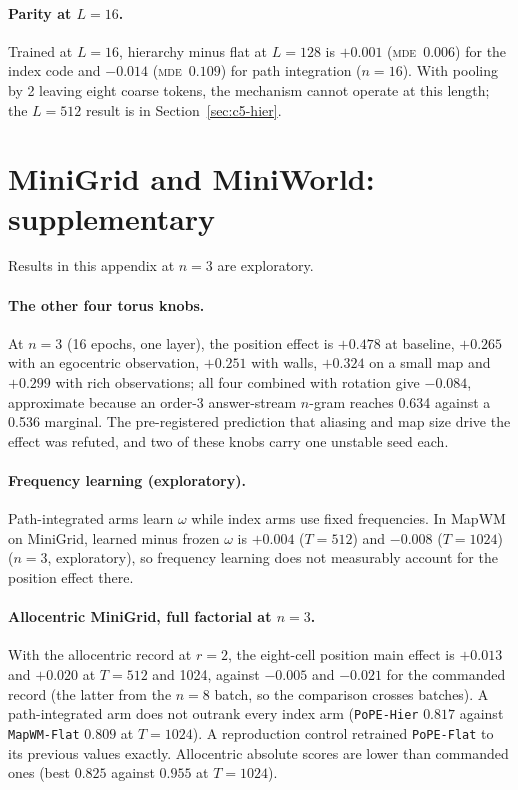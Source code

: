 \documentclass[10pt]{article}
\newcommand{\mde}{\textsc{mde}}
\newcommand{\arm}[1]{\texttt{#1}}
\begin{document}
\paragraph{Parity at $L=16$.} Trained at $L=16$, hierarchy minus flat at $L=128$ is $+0.001$ (\mde\ $0.006$)
for the index code and $-0.014$ (\mde\ $0.109$) for path integration ($n=16$). With pooling by 2 leaving eight
coarse tokens, the mechanism cannot operate at this length; the $L=512$ result is in Section~\ref{sec:c5-hier}.

\section{MiniGrid and MiniWorld: supplementary}
\label{app:env}

Results in this appendix at $n=3$ are exploratory.

\paragraph{The other four torus knobs.} At $n=3$ (16 epochs, one layer), the position effect is $+0.478$ at
baseline, $+0.265$ with an egocentric observation, $+0.251$ with walls, $+0.324$ on a small map and $+0.299$
with rich observations; all four combined with rotation give $-0.084$, approximate because an order-3 answer-stream $n$-gram reaches
0.634 against a 0.536 marginal. The pre-registered prediction that
aliasing and map size drive the effect was refuted, and two of these knobs carry one unstable seed each.

\paragraph{Frequency learning (exploratory).} Path-integrated arms learn $\omega$ while index
arms use fixed frequencies. In MapWM on MiniGrid, learned minus frozen $\omega$ is $+0.004$ ($T=512$) and
$-0.008$ ($T=1024$) ($n=3$, exploratory), so frequency learning does not measurably account for the position effect there. %

\paragraph{Allocentric MiniGrid, full factorial at $n=3$.} With the allocentric record at $r=2$, the eight-cell
position main effect is $+0.013$ and $+0.020$ at $T=512$ and 1024, against $-0.005$ and $-0.021$ for the
commanded record (the latter from the $n=8$ batch, so the comparison crosses batches). A path-integrated arm
does not outrank every index arm (\arm{PoPE-Hier} $0.817$ against \arm{MapWM-Flat} $0.809$ at $T=1024$). A
reproduction control retrained \arm{PoPE-Flat} to its previous values exactly. Allocentric absolute scores are
lower than commanded ones (best $0.825$ against $0.955$ at $T=1024$). %
\end{document}
